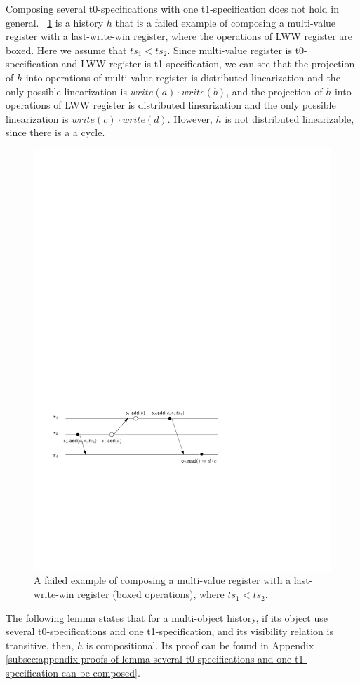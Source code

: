 {Composing several t0-specifications with one t1-specification does not hold in general. \figurename~\ref{fig:a failed example of composing a multi-value register with a last-write-win register} is a history $h$ that is a failed example of composing a multi-value register with a last-write-win register, where the operations of LWW register are boxed. Here we assume that $\mathit{ts}_1<\mathit{ts}_2$. Since multi-value register is t0-specification and LWW register is t1-specification, we can see that the projection of $h$ into operations of multi-value register is distributed linearization and the only possible linearization is $\mathit{write}(a) \cdot \mathit{write}(b)$, and the projection of $h$ into operations of LWW register is distributed linearization and the only possible linearization is $\mathit{write}(c) \cdot \mathit{write}(d)$. However, $h$ is not distributed linearizable, since there is a a cycle.

\begin{figure}[t]
  \centering
  \includegraphics[width=0.6 \textwidth]{figures/MVReg-LWWReg-Nocd.pdf}
\vspace{-10pt}
  \caption{A failed example of composing a multi-value register with a last-write-win register (boxed operations), where $\mathit{ts}_1 < \mathit{ts}_2$.}
  \label{fig:a failed example of composing a multi-value register with a last-write-win register}
\end{figure}

The following lemma states that for a multi-object history, if its object use several t0-specifications and one t1-specification, and its visibility relation is transitive, then, $h$ is compositional. Its proof can be found in Appendix \ref{subsec:appendix proofs of lemma several t0-specifications and one t1-specification can be composed}.

}
